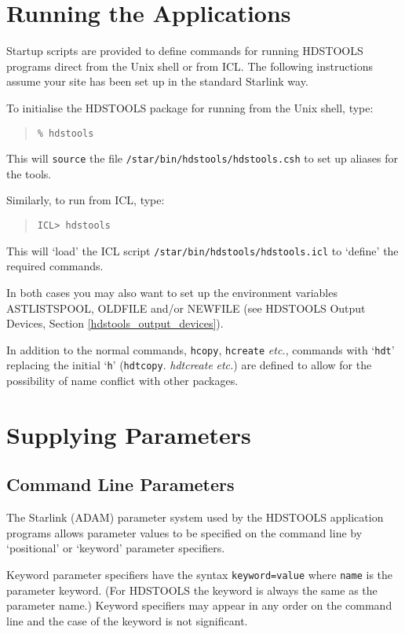 \documentclass[twoside,11pt]{article}
\newcommand{\htmlref}[2]{#1}
\newcommand{\latex}[1]{#1}
\newcommand{\xref}[3]{#1}
\renewcommand{\_}{\texttt{\symbol{95}}}
\begin{document}
\section{Running the Applications}
Startup scripts are provided to define commands for running HDSTOOLS programs
direct from the Unix shell or from
\xref{ICL}{sg5}{}.
The following instructions assume your site has been set up in the standard
Starlink way.

To initialise the HDSTOOLS package for running from the Unix shell, type:
\begin{quote}
\texttt{\% hdstools}
\end{quote}
This will \texttt{source} the file \texttt{/star/bin/hdstools/hdstools.csh}
to set up aliases for the tools.

Similarly, to run from ICL, type:
\begin{quote}
\texttt{ICL> hdstools}
\end{quote}
This will `load' the ICL script \texttt{/star/bin/hdstools/hdstools.icl}
to `define' the required commands.

In both cases you may also want to set up the environment variables
AST\_LIST\_SPOOL, OLDFILE and/or NEWFILE (see
\htmlref{HDSTOOLS Output Devices}{hdstools_output_devices}\latex{, Section \ref{hdstools_output_devices}}).

In addition to the normal commands, \texttt{hcopy}, \texttt{hcreate}
\textit{etc.}, commands with `\texttt{hdt\_}' replacing the initial
`\texttt{h}' (\texttt{hdt\_copy}. \textit{hdt\_create} \textit{etc.}) are
defined to allow for the possibility of name conflict with other packages.

\section{Supplying Parameters}

\subsection{Command Line Parameters}
The Starlink (ADAM) parameter system used by the HDSTOOLS application programs
allows parameter values to be specified on the command line by `positional' or
`keyword' parameter specifiers.

Keyword parameter specifiers have the syntax
\texttt{keyword=value} where \texttt{name} is the parameter keyword.
(For HDSTOOLS the keyword is always the same as the parameter name.)
Keyword specifiers may appear in any order on the command line and the case of
the keyword is not significant.
\end{document}
